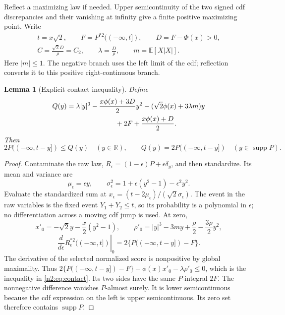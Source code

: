 \documentclass[11pt,a4paper]{article}
\numberwithin{equation}{section}
\newtheorem{lemma}[theorem]{Lemma}
\theoremstyle{definition}
\theoremstyle{remark}
\newcommand{\E}{\mathbb E}
\newcommand{\R}{\mathbb R}
\DeclareMathOperator{\supp}{supp}
\begin{document}
Reflect a maximizing law if needed. Upper semicontinuity of the two signed
cdf discrepancies and their vanishing at infinity give a finite positive
maximizing point. Write
\[
 \begin{gathered}
 t=x\sqrt2,\qquad F=P^{*2}(( -\infty,t]),\qquad D=F-\Phi(x)>0,\\
 C=\frac{\sqrt2D}{\rho}=C_2,\qquad
 \lambda=\frac D\rho,\qquad m=\E[X|X|].
 \end{gathered}
\]
Here $|m|\le1$. The negative branch uses the left limit of the cdf; reflection
converts it to this positive right-continuous branch.

\begin{lemma}[Explicit contact inequality]\label{n2:lem:contact}
Define
\begin{align}
 Q(y)={}&\lambda|y|^3-\frac{x\phi(x)+3D}{2}y^2
       -(\sqrt2\phi(x)+3\lambda m)y\notag\\
       &\hspace{20mm}+2F+\frac{x\phi(x)+D}{2}.\label{n2:eq:Q}
\end{align}
Then
\begin{equation}\label{n2:eq:contact}
 2P(( -\infty,t-y])\le Q(y)\quad(y\in\R),
 \qquad Q(y)=2P(( -\infty,t-y])\quad(y\in\supp P).
\end{equation}
\end{lemma}
\begin{proof}
Contaminate the raw law, $R_\epsilon=(1-\epsilon)P+\epsilon\delta_y$, and then
standardize. Its mean and variance are
\[
 \mu_\epsilon=\epsilon y,\qquad
 \sigma_\epsilon^2=1+\epsilon(y^2-1)-\epsilon^2y^2.
\]
Evaluate the standardized sum at
$x_\epsilon=(t-2\mu_\epsilon)/(\sqrt2\sigma_\epsilon)$.
The event in the raw variables is the fixed event $Y_1+Y_2\le t$, so its
probability is a polynomial in $\epsilon$; no differentiation across a
moving cdf jump is used. At zero,
\[
 x'_0=-\sqrt2y-\frac x2(y^2-1),\qquad
 \rho'_0=|y|^3-3my+\frac\rho2-\frac{3\rho}2y^2,
\]
\[
 \left.\frac d{d\epsilon}R_\epsilon^{*2}(( -\infty,t])\right|_0
 =2\{P(( -\infty,t-y])-F\}.
\]
The derivative of the selected normalized score is nonpositive by global
maximality. Thus
$2\{P(( -\infty,t-y])-F\}-\phi(x)x'_0-\lambda\rho'_0\le0$,
which is the inequality in \eqref{n2:eq:contact}. Its two sides have the same
$P$-integral $2F$. The nonnegative difference vanishes $P$-almost surely.
It is lower semicontinuous because the cdf expression on the left is upper
semicontinuous. Its zero set therefore contains $\supp P$.
\end{proof}
\end{document}
